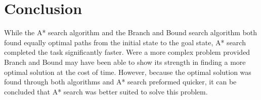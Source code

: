\documentclass[12pt, letterpaper, final, onecolumn, titlepage] {article}
\begin{document}
\section{Conclusion}
While the A* search algorithm and the Branch and Bound search algorithm both found equally optimal paths from the initial state to the goal state, A* search completed the task significantly faster.  Were a more complex problem provided Branch and Bound may have been able to show its strength in finding a more optimal solution at the cost of time.  However, because the optimal solution was found through both algorithms and A* search preformed quicker, it can be concluded that A* search was better suited to solve this problem.
\end{document}
